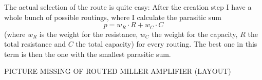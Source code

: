 The actual selection of the route is quite easy: After the creation step I have a whole bunch of possible routings, where I calculate the parasitic sum
\[p = w_R \cdot R + w_C \cdot C\]
(where $w_R$ is the weight for the resistance, $w_C$ the weight for the capacity, $R$ the total resistance and $C$ the total capacity) for every routing. The best one in this term is then the one with the smallest parasitic sum.

PICTURE MISSING OF ROUTED MILLER AMPLIFIER (LAYOUT)